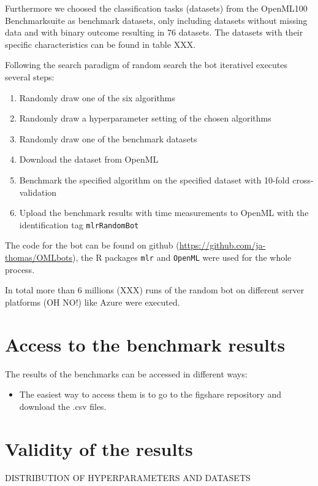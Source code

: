 \documentclass{article}
\begin{document}
Furthermore we choosed the classification tasks (datasets) from the OpenML100 
Benchmarksuite \citep{Bischl2017} as benchmark datasets, only including datasets without 
missing data and with binary outcome resulting in 76 datasets.
The datasets with their specific characteristics can be found in table XXX. 

Following the search paradigm of random search the bot iterativel executes several steps:
\begin{enumerate}
\item Randomly draw one of the six algorithms
\item Randomly draw a hyperparameter setting of the chosen algorithms
\item Randomly draw one of the benchmark datasets
\item Download the dataset from OpenML
\item Benchmark the specified algorithm on the specified dataset with 10-fold cross-validation
\item Upload the benchmark results with time measurements to OpenML with the 
identification tag \texttt{mlrRandomBot}
\end{enumerate}

The code for the bot can be found on github (\url{https://github.com/ja-thomas/OMLbots}), the R packages \texttt{mlr} \citep{Bischl2016} 
and \texttt{OpenML} \citep{Casalicchio2017} were used for the whole process. 

In total more than 6 millions (XXX) runs of the random bot on different 
server platforms (OH NO!) like Azure were executed.

\section{Access to the benchmark results}

The results of the benchmarks can be accessed in different ways:

\begin{itemize}
\item The easiest way to access them is to go to the figshare repository \citep{Probst2017} and
download the .csv files. 
\end{itemize}

\section{Validity of the results}

DISTRIBUTION OF HYPERPARAMETERS AND DATASETS
\end{document}
